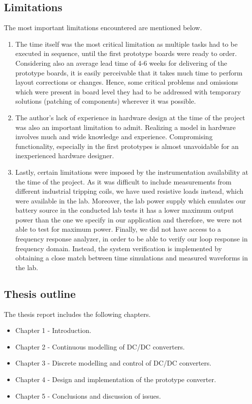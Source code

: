\subsection{Limitations}

The most important limitations encountered are mentioned below.

\begin{enumerate}
    \item The time itself was the most critical limitation as multiple tasks had to be executed in sequence, until the first prototype boards were ready to order. Considering also an average lead time of 4-6 weeks for delivering of the prototype boards, it is easily perceivable that it takes much time to perform layout corrections or changes. Hence, some critical problems and omissions which were present in board level they had to be addressed with temporary solutions (patching of components) wherever it was possible.
    \item The author's lack of experience in hardware design at the time of the project was also an important limitation to admit. Realizing a model in hardware involves much and wide knowledge and experience. Compromising functionality, especially in the first prototypes is almost unavoidable for an inexperienced hardware designer.
    \item Lastly, certain limitations were imposed by the instrumentation availability at the time of the project. As it was difficult to include measurements from different industrial tripping coils, we have used resistive loads instead, which were available in the lab. Moreover, the lab power supply which emulates our battery source in the conducted lab tests it has a lower maximum output power than the one we specify in our application and therefore, we were not able to test for maximum power. Finally, we did not have access to a frequency response analyzer, in order to be able to verify our loop response in frequency domain. Instead, the system verification is implemented by obtaining a close match between time simulations and measured waveforms in the lab. 
\end{enumerate}

\subsection{Thesis outline}

The thesis report includes the following chapters.

\begin{itemize}
    \item Chapter 1 - Introduction.
    \item Chapter 2 - Continuous modelling of DC/DC converters.
    \item Chapter 3 - Discrete modelling and control of DC/DC converters. 
    \item Chapter 4 - Design and implementation of the prototype converter.
    \item Chapter 5 - Conclusions and discussion of issues.
\end{itemize}
